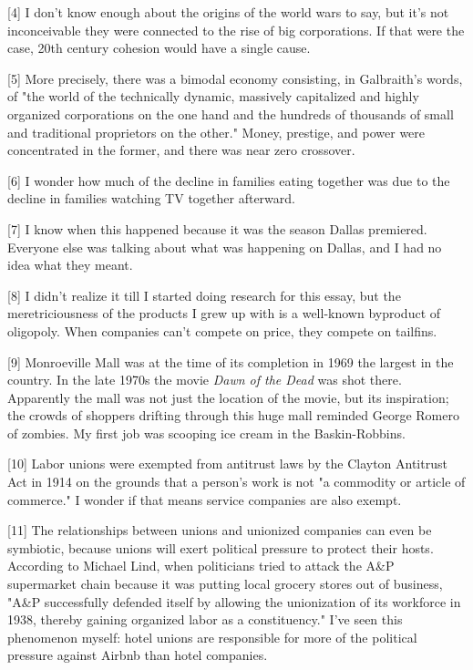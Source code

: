 [4]
I don't know enough about the origins of the world wars to
say, but it's not inconceivable they were connected to the rise of
big corporations. If that were the case, 20th century cohesion would
have a single cause.

[5]
More precisely, there was a bimodal economy consisting, in
Galbraith's words, of "the world of the technically dynamic, massively
capitalized and highly organized corporations on the one hand and
the hundreds of thousands of small and traditional proprietors on
the other." Money, prestige, and power were concentrated in the
former, and there was near zero crossover.

[6]
I wonder how much of the decline in families eating together
was due to the decline in families watching TV together afterward.

[7]
I know when this happened because it was the season Dallas
premiered.  Everyone else was talking about what was happening on
Dallas, and I had no idea what they meant.

[8]
I didn't realize it till I started doing research for this
essay, but the meretriciousness of the products I grew up with is
a well-known byproduct of oligopoly. When companies can't compete
on price, they compete on tailfins.

[9]
Monroeville Mall was at the time of its completion in 1969
the largest in the country. In the late 1970s the movie \emph{Dawn of
the Dead} was shot there. Apparently the mall was not just the
location of the movie, but its inspiration; the crowds of shoppers
drifting through this huge mall reminded George Romero of zombies.
My first job was scooping ice cream in the Baskin-Robbins.

[10]
Labor unions were exempted from antitrust laws by the Clayton
Antitrust Act in 1914 on the grounds that a person's work is not
"a commodity or article of commerce." I wonder if that means service
companies are also exempt.

[11]
The relationships between unions and unionized companies can
even be symbiotic, because unions will exert political pressure to
protect their hosts.  According to Michael Lind, when politicians
tried to attack the A\&P supermarket chain because it was putting
local grocery stores out of business, "A\&P successfully defended
itself by allowing the unionization of its workforce in 1938, thereby
gaining organized labor as a constituency." I've seen this phenomenon
myself: hotel unions are responsible for more of the political
pressure against Airbnb than hotel companies.

